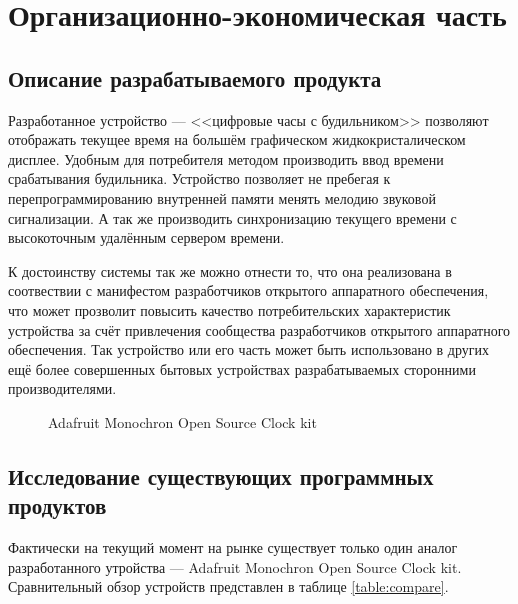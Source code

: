 \section{Организационно-экономическая часть}

\subsection{Описание разрабатываемого продукта}
\begin{par}
Разработанное устройство --- <<цифровые часы с будильником>> позволяют отображать
текущее время на большём графическом жидкокристалическом дисплее. Удобным для
потребителя методом производить ввод времени срабатывания будильника.
Устройство позволяет не пребегая к перепрограммированию внутренней памяти менять
мелодию звуковой сигнализации. А так же производить синхронизацию текущего времени
с высокоточным удалённым сервером времени.
\end{par}

\begin{par}
К достоинству системы так же можно отнести то, что она реализована в соотвествии с манифестом
разработчиков открытого аппаратного обеспечения, что может прозволит повысить качество потребительских
характеристик устройства за счёт привлечения сообщества разработчиков открытого аппаратного
обеспечения. Так устройство или его часть может быть использовано в других ещё более
совершенных бытовых устройствах разрабатываемых сторонними производителями.

\begin{figure}[h]
	\caption{Adafruit Monochron Open Source Clock kit}
	\label{img:adafruit}
\end{figure}

\end{par}

\subsection{Исследование существующих программных продуктов}
\begin{par}
Фактически на текущий момент на рынке существует только один аналог разработанного
утройства ---  Adafruit Monochron Open Source Clock kit.
Сравнительный обзор устройств представлен в таблице \ref{table:compare}.
\end{par}



